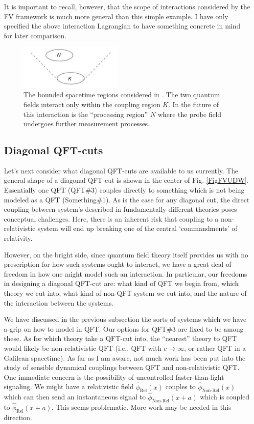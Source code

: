 \documentclass[prd,twocolumn,superscriptaddress,floatfix,amsmath,amssymb,amsfonts,nofootinbib]{revtex4-2}
\begin{document}
It is important to recall, however, that the scope of interactions considered by the FV framework is much more general than this simple example. I have only specified the above interaction Lagrangian to have something concrete in mind for later comparison.

\begin{figure}
\includegraphics[width=0.45\textwidth]{Figures/FVframework.pdf}
\caption{The bounded spacetime regions considered in \cite{Ruep2021}. The two quantum fields interact only within the coupling region $K$. In the future of this interaction is the ``processing region'' $N$ where the probe field undergoes further measurement processes.}\label{FigFV}
\end{figure}

\subsection{Diagonal QFT-cuts}
Let's next consider what diagonal QFT-cuts are available to us currently. The general shape of a diagonal QFT-cut is shown in the center of Fig. \ref{FigFVUDW}. Essentially one QFT (QFT\#3) couples directly to something which is not being modeled as a QFT (Something\#1). As is the case for any diagonal cut, the direct coupling between system's described in fundamentally different theories poses conceptual challenges. Here, there is an inherent risk that coupling to a non-relativistic system will end up breaking one of the central `commandments' of relativity. 

However, on the bright side, since quantum field theory itself provides us with no prescription for how such systems ought to interact, we have a great deal of freedom in how one might model such an interaction. In particular, our freedoms in designing a diagonal QFT-cut are: what kind of QFT we begin from, which theory we cut into, what kind of non-QFT system we cut into, and the nature of the interaction between the systems.

We have discussed in the previous subsection the sorts of systems which we have a grip on how to model in QFT. Our options for QFT\#3 are fixed to be among these. As for which theory take a QFT-cut into, the ``nearest'' theory to QFT would likely be non-relativistic QFT (i.e., QFT with $c\to\infty$, or rather QFT in a Galilean spacetime). As far as I am aware, not much work has been put into the study of sensible dynamical couplings between QFT and non-relativistic QFT. One immediate concern is the possibility of uncontrolled faster-than-light signaling. We might have a relativistic field $\hat\phi_\text{Rel}(x)$ couples to  $\hat\phi_\text{Non-Rel}(x)$ which can then send an instantaneous signal to $\hat\phi_\text{Non-Rel}(x+a)$ which is coupled to $\hat\phi_\text{Rel}(x+a)$. This seems problematic. More work may be needed in this direction.
\end{document}

